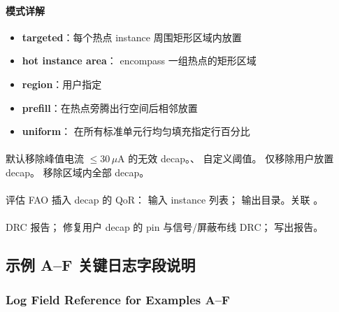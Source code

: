 \paragraph{ 模式详解}
\begin{itemize}
  \item \textbf{targeted}：每个热点 instance 周围矩形区域内放置
  \item \textbf{hot instance area}： encompass 一组热点的矩形区域
  \item \textbf{region}：用户指定 
  \item \textbf{prefill}：在热点旁腾出行空间后相邻放置
  \item \textbf{uniform}： 在所有标准单元行均匀填充指定行百分比
\end{itemize}

\paragraph{}
默认移除峰值电流 $\le 30\,\mu$A 的无效 decap。、 自定义阈值。 仅移除用户放置 decap。 移除区域内全部 decap。

\paragraph{}
评估 FAO 插入 decap 的 QoR： 输入 instance 列表； 输出目录。关联 。

\paragraph{}
DRC 报告； 修复用户 decap 的 pin 与信号/屏蔽布线 DRC； 写出报告。

\subsection{示例 A--F 关键日志字段说明}
\subsubsection*{Log Field Reference for Examples A--F}

